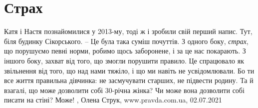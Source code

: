 
 
 
 
 
\chapter{Страх}
\label{sec:slova.strah}

Катя і Настя познайомилися у 2013-му, тоді ж і зробили свій перший напис. Тут,
біля будинку Сікорського. – Це була така суміш почуттів. З одного боку,
\emph{страх}, що порушуємо певні норми, робимо щось заборонене, і за це нас
покарають. З іншого боку, захват від того, що змогли порушити правило. Це
спрацювало як звільнення від того, що над нами тяжіло, і що ми навіть не
усвідомлювали.  Бо ти все життя правильна дівчинка: не засмучувати старших, не
підвести родину.  Та й взагалі, що може дозволити собі 30-річна жінка? Чи може
вона дозволити собі писати на стіні? Може!
, 
Олена Струк, www.pravda.com.ua, 02.07.2021 

